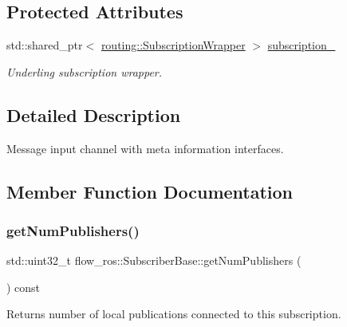 \subsection*{Protected Attributes}
\begin{DoxyCompactItemize}
\item 
\mbox{\label{classflow__ros_1_1_subscriber_base_ac30d4bd880dd826f4930b3abef1da02f}} 
std\+::shared\+\_\+ptr$<$ \hyperlink{classflow__ros_1_1routing_1_1_subscription_wrapper}{routing\+::\+Subscription\+Wrapper} $>$ \hyperlink{classflow__ros_1_1_subscriber_base_ac30d4bd880dd826f4930b3abef1da02f}{subscription\+\_\+}
\begin{DoxyCompactList}\small\item\em Underling subscription wrapper. \end{DoxyCompactList}\end{DoxyCompactItemize}


\subsection{Detailed Description}
Message input channel with meta information interfaces. 

\subsection{Member Function Documentation}
\mbox{\label{classflow__ros_1_1_subscriber_base_aabaa5a35708ea005c95b2ab206bc172e}} 
\subsubsection{\texorpdfstring{get\+Num\+Publishers()}{getNumPublishers()}}
{\footnotesize\ttfamily std\+::uint32\+\_\+t flow\+\_\+ros\+::\+Subscriber\+Base\+::get\+Num\+Publishers (\begin{DoxyParamCaption}{ }\end{DoxyParamCaption}) const\hspace{0.3cm}{\ttfamily [inline]}}



Returns number of local publications connected to this subscription. 

